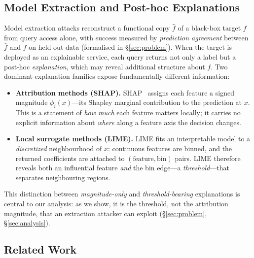 \documentclass[sigconf,anonymous,review]{acmart}
\begin{document}
\subsection{Model Extraction and Post-hoc Explanations}
\label{subsec:prelim}

Model extraction attacks reconstruct a functional copy $\hat{f}$ of a black-box
target $f$ from query access alone, with success measured by \emph{prediction
agreement} between $\hat{f}$ and $f$ on held-out data (formalised in
\S\ref{sec:problem}). When the target is deployed as an explainable service, each
query returns not only a label but a post-hoc \emph{explanation}, which may reveal
additional structure about $f$. Two dominant explanation families expose
fundamentally different information:

\begin{itemize}
  \item \textbf{Attribution methods (SHAP).} SHAP~\cite{lundberg2017shap} assigns
  each feature a signed magnitude $\phi_i(x)$---its Shapley marginal contribution
  to the prediction at $x$. This is a statement of \emph{how much} each feature
  matters locally; it carries no explicit information about \emph{where} along a
  feature axis the decision changes.
  \item \textbf{Local surrogate methods (LIME).} LIME fits an interpretable model
  to a \emph{discretized} neighbourhood of $x$: continuous features are binned, and
  the returned coefficients are attached to $(\text{feature}, \text{bin})$ pairs.
  LIME therefore reveals both an influential feature \emph{and} the bin edge---a
  \emph{threshold}---that separates neighbouring regions.
\end{itemize}

This distinction between \emph{magnitude-only} and \emph{threshold-bearing}
explanations is central to our analysis: as we show, it is the threshold, not the
attribution magnitude, that an extraction attacker can exploit
(\S\ref{sec:problem}, \S\ref{sec:analysis}).

\subsection{Related Work}
\label{subsec:related}
\end{document}
